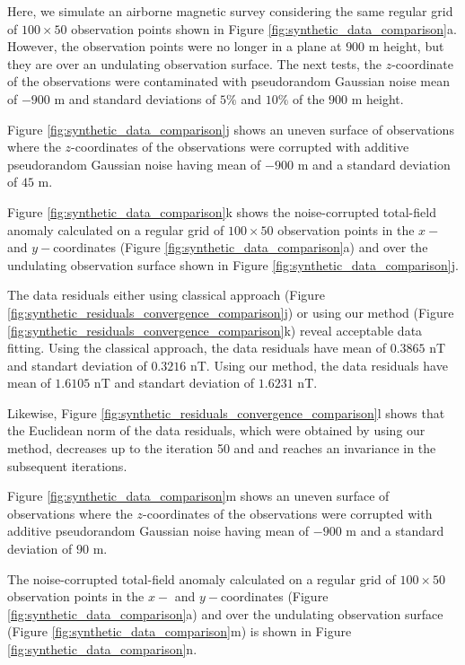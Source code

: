 Here, we simulate an airborne magnetic survey considering the same regular grid of $100 \times 50$ observation points shown in Figure  \ref{fig:synthetic_data_comparison}a.
However, the observation points were no longer in a plane at $900$ m height, 
but they are over an undulating observation surface.
The next tests, the $z$-coordinate of the observations were contaminated with 
pseudorandom Gaussian noise mean of $- 900$ m and standard deviations of $5\%$ and $10\%$ of the $900$ m height.


Figure \ref{fig:synthetic_data_comparison}j shows an uneven surface of observations where  the $z$-coordinates of the observations were corrupted with additive  pseudorandom Gaussian noise having mean of  $- 900$ m  and a standard deviation of $45$ m.
 
Figure \ref{fig:synthetic_data_comparison}k shows the noise-corrupted total-field anomaly calculated 
on a regular grid  of $100 \times 50$ observation points in the $x-$ and $y-$coordinates 
(Figure  \ref{fig:synthetic_data_comparison}a) and
over the undulating observation surface shown in Figure \ref{fig:synthetic_data_comparison}j.
 
The data residuals either using classical approach 
(Figure \ref{fig:synthetic_residuals_convergence_comparison}j) or
using our method (Figure \ref{fig:synthetic_residuals_convergence_comparison}k) reveal acceptable data fitting.
Using the classical approach, the data residuals have mean of $0.3865$ nT 
and standart deviation of $0.3216$ nT.
Using our method, the data residuals have mean of $1.6105$ nT and standart deviation of $1.6231$ nT. 

Likewise,  Figure \ref{fig:synthetic_residuals_convergence_comparison}l shows that the Euclidean norm of the data residuals, which were obtained by using our method, decreases up to the iteration 50 and 
and reaches an invariance in the subsequent iterations.  



Figure \ref{fig:synthetic_data_comparison}m shows an uneven surface of observations where  the $z$-coordinates of the observations were corrupted with additive pseudorandom Gaussian noise having mean of  $- 900$ m  and a standard deviation of $90$ m.

The noise-corrupted total-field anomaly calculated on a regular grid  of $100 \times 50$ observation points in the $x-$ and $y-$coordinates (Figure  \ref{fig:synthetic_data_comparison}a) and
over the undulating observation surface (Figure \ref{fig:synthetic_data_comparison}m)
is shown in Figure \ref{fig:synthetic_data_comparison}n.

